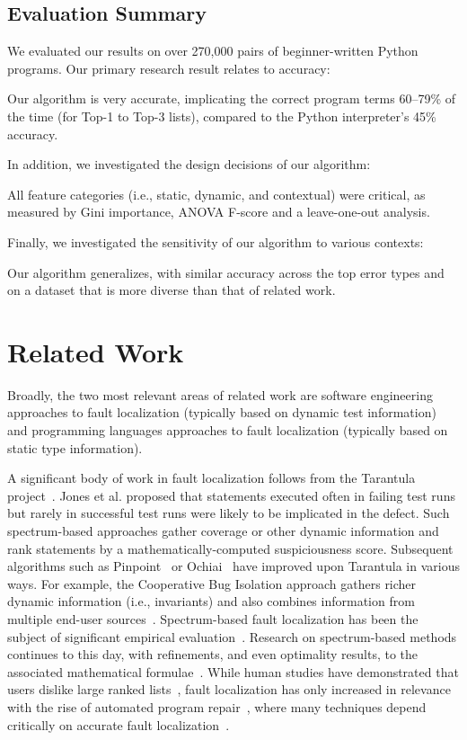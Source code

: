 \documentclass[conference]{IEEEtran}
\begin{document}
\subsection{Evaluation Summary}

We evaluated our results on over 270,000 pairs of beginner-written Python
programs. Our primary research result relates to accuracy:
\begin{framed}
\noindent Our algorithm is very accurate, implicating the correct program
terms 60--79\% of the time (for Top-1 to Top-3 lists), compared to the
Python interpreter's 45\% accuracy.
\end{framed}
In addition, we investigated the design decisions of our algorithm:
\begin{framed}
\noindent All feature categories (i.e., static, dynamic, and contextual)
were critical, as measured by Gini importance, ANOVA F-score
and a leave-one-out analysis.
\end{framed}
Finally, we investigated the sensitivity of our algorithm to various
contexts:
\begin{framed}
\noindent Our algorithm generalizes, with similar accuracy across the top
error types and on a dataset that is more diverse than that of related
work.
\end{framed}

\section{Related Work}

Broadly, the two most relevant areas of related work are
software engineering approaches to fault localization (typically based on
dynamic test information) and programming languages approaches to fault
localization (typically based on static type information).

A significant body of work in fault localization follows from the Tarantula
project~\cite{tarantula}. Jones et al. proposed that statements executed
often in failing test runs but rarely in successful test runs were likely
to be implicated in the defect. Such spectrum-based approaches gather
coverage or other dynamic information and rank statements by a
mathematically-computed suspiciousness score. Subsequent algorithms
such as Pinpoint~\cite{chen02} or Ochiai~\cite{Abreu2006} have improved
upon Tarantula in various ways. For example, the Cooperative Bug Isolation
approach gathers richer dynamic information (i.e., invariants) and also
combines information from multiple end-user sources~\cite{liblit05}.
Spectrum-based fault localization has been
the subject of significant empirical evaluation~\cite{Abreu2009}.
Research on spectrum-based methods continues to this day, with
refinements, and even optimality results, to the associated
mathematical formulae~\cite{yoo2017}. While human studies have demonstrated
that users dislike large ranked lists~\cite{orso-parnin}, fault
localization has only increased in relevance with the rise of automated
program repair~\cite{genprog-tse-journal,semfix13}, where many techniques
depend critically on accurate fault localization~\cite{gpfaultloc}.
\end{document}
